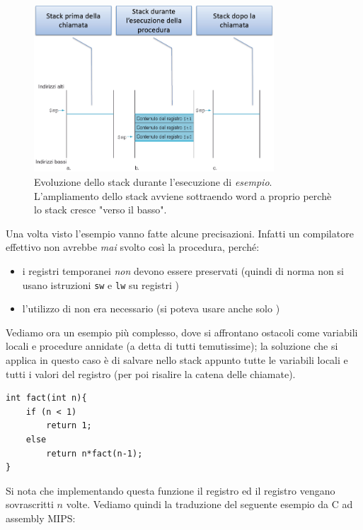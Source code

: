 \documentclass[class=book, crop=false, oneside]{standalone}
\begin{document}
\begin{figure}[H]
	\centering
	\caption{Evoluzione dello stack durante l'esecuzione di \emph{esempio}. L'ampliamento dello stack avviene sottraendo word a  proprio perchè lo stack cresce "verso il basso".}
	\includegraphics[width=0.8\textwidth,keepaspectratio]{Evoluzione-stack}
\end{figure}

Una volta visto l'esempio vanno fatte alcune precisazioni. Infatti un compilatore effettivo non avrebbe \emph{mai} svolto così la procedura, perché:
\begin{itemize}
	\item i registri temporanei \emph{non} devono essere preservati (quindi di norma non si usano istruzioni \texttt{sw} e \texttt{lw} su registri )
	\item l'utilizzo di  non era necessario (si poteva usare anche solo )
\end{itemize}

Vediamo ora un esempio più complesso, dove si affrontano ostacoli come variabili locali e procedure annidate (a detta di tutti temutissime); la soluzione che si applica in questo caso è di salvare nello stack appunto tutte le variabili locali e tutti i valori del registro  (per poi risalire la catena delle chiamate).

\begin{verbatim}
int fact(int n){
	if (n < 1)
		return 1;
	else
		return n*fact(n-1);
}
\end{verbatim}

Si nota che implementando questa funzione il registro  ed il registro  vengano sovrascritti $n$ volte.
Vediamo quindi la traduzione del seguente esempio da C ad assembly MIPS:
\end{document}
